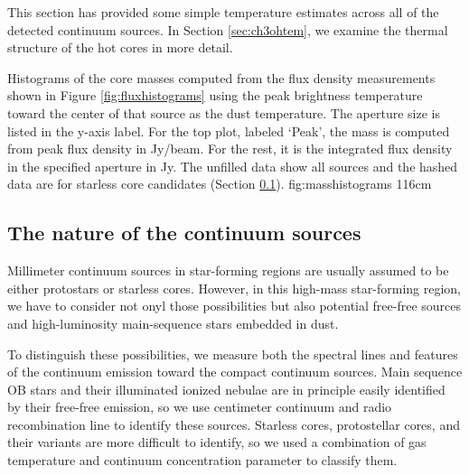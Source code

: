 \documentclass{aa}
\begin{document}
This section has provided some simple temperature estimates across all of the
detected continuum sources.  In Section \ref{sec:ch3ohtem}, we  examine
the thermal structure of the hot cores in more detail.



{Histograms of the core masses computed from the flux density measurements
shown in Figure \ref{fig:fluxhistograms} using the peak brightness temperature 
toward the center of that source as the dust temperature.
The aperture size is listed in the y-axis label.  For the top plot, labeled
`Peak', the mass is computed from peak
flux density in Jy/beam.  For the rest, it is the integrated flux density in
the specified aperture in Jy.  The unfilled data show all sources and the
hashed
data are for starless core candidates (Section \ref{sec:contsourcenature}).}
{fig:masshistograms}
{1}{16cm}

\subsection{The nature of the continuum sources}
\label{sec:contsourcenature}
Millimeter continuum sources in star-forming regions are usually assumed to be
either protostars or starless cores.  However, in this high-mass star-forming
region, we have to consider not onyl those possibilities but also potential
free-free sources and high-luminosity main-sequence stars embedded in dust.

To distinguish these possibilities, we measure both the spectral lines and
features of the continuum emission toward the compact continuum sources.  Main
sequence OB stars and their illuminated ionized nebulae are in principle easily
identified by their free-free emission, so we use centimeter continuum and
radio recombination line to identify these sources.  Starless cores,
protostellar cores, and their variants are more difficult to identify, so we
used a combination of gas temperature and continuum concentration parameter to
classify them.
\end{document}
